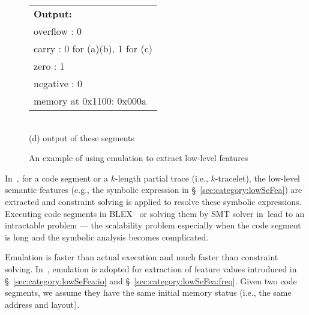 \begin{figure}[tb]
\begin{minipage}{0.5\linewidth}
\begin{tabular}{l}
 \textbf{Output:} \\
overflow : 0 \\
carry : 0 for (a)(b), 1 for (c)\\
zero : 1\\
negative : 0\\
memory at 0x1100: 0x000a\\
\end{tabular}
\\[0.15cm] (d)  output of these segments \label{fig:emulation:d}
\end{minipage}
\vspace{-2mm}
\caption{An example of using emulation to extract low-level features}
\label{fig:emulation}
\end{figure}

In~\tool, for a code segment or a $k$-length partial trace (i.e., $k$-tracelet), the low-level semantic features (e.g., the symbolic expression in \S~\ref{sec:category:lowSeFea}) are extracted and constraint solving is applied to resolve these symbolic expressions. Executing code segments in \textsc{BLEX}~\cite{egele2014blanket} or solving them by SMT solver in~\tool  lead to an intractable problem --- the scalability problem especially when the code segment is long and the  symbolic analysis becomes complicated.

Emulation is faster than actual execution and much faster than constraint solving. In~\toolNew, emulation  is adopted for extraction of feature values introduced in \S~\ref{sec:category:lowSeFea:io} and \S~\ref{sec:category:lowSeFea:freq}. Given two code segments, we assume they have the same initial memory status (i.e., the same address and layout). 

